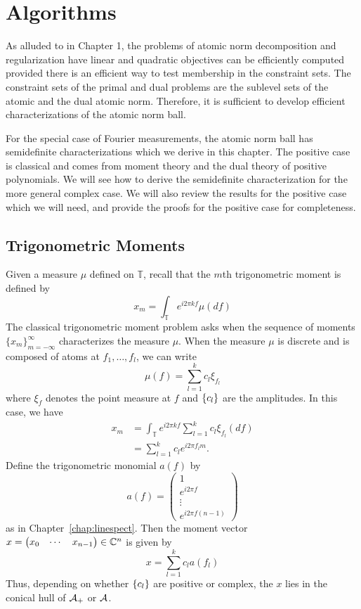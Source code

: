 \chapter{Algorithms}
\label{chap:algos}

As alluded to in Chapter 1,  the
problems of atomic norm decomposition and regularization have linear and
quadratic objectives can be efficiently computed provided there is an efficient
way to test membership in the constraint sets. The constraint sets of the primal
and dual problems are the sublevel sets of the atomic and the dual atomic norm.
Therefore, it is sufficient to develop efficient characterizations of the atomic
norm ball.

For the special case of Fourier measurements, the atomic norm ball has
semidefinite characterizations which we derive in this chapter. The positive
case is classical and comes from moment theory and the dual theory of positive
polynomials. We will see how to derive the semidefinite characterization for the
more general complex case. We will also review the results for the positive case
which we will need, and provide the proofs for the positive case for
completeness.

\section{Trigonometric Moments}

Given a measure $\mu$ defined on $\mathbb{T}$, recall that the $m$th
trigonometric moment is defined by
\begin{equation}
	\label{eq:trig-moment-measure}
	x_m = \int_\mathbb{T} e^{i 2 \pi k f} \mu ( d f)
\end{equation}
The classical trigonometric moment problem asks when the sequence of moments
$\{x_m\}_{m=-\infty}^{\infty}$ characterizes the measure $\mu$. When the measure $\mu$ is discrete and is composed of atoms at $f_1, \ldots, f_l$, we can write
\[
\mu(f) = \sum_{l=1}^k c_l \xi_{f_l}
\]
where $\xi_f$ denotes the point measure at $f$ and $\left\{ c_l \right\}$ are the amplitudes. In this case, we have
\begin{align}
	x_m &= \int_\mathbb{T} e^{i 2 \pi k f} \sum_{l=1}^k c_l \xi_{f_l}(d f)\\
	&= \sum_{l=1}^k c_l e^{i 2 \pi f_l m}.
\end{align}
Define the trigonometric monomial $a(f)$ by
\[
a(f) = \begin{pmatrix}
	1\\
	e^{i 2\pi f}\\
	\vdots\\
	e^{i2\pi f (n-1)}
\end{pmatrix}
\] as in Chapter~\ref{chap:linespect}. Then the moment vector
$x = \begin{pmatrix}x_0 & \cdots & x_{n-1}\end{pmatrix} \in \mathbb{C}^n$ is given by
\[
x = \sum_{l=1}^k c_l a(f_l)
\]
Thus, depending on whether $\left\{ c_l \right\}$ are positive or complex, the $x$ lies in
the conical hull of $\mathcal{A}_+$ or $\mathcal{A}$.

